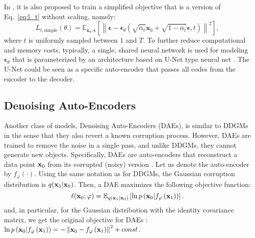 In \citet{ho2020denoising}, it is also proposed to train a simplified objective that is a version of Eq.~\ref{eq:l_t} without scaling, namely:
\begin{equation}\label{eq:l_t_simple}
    L_{t,\text {simple}}(\theta) = \mathbb{E}_{\mathbf{x}_{0}, \boldsymbol{\epsilon}}\left[\left\|\boldsymbol{\epsilon}-\boldsymbol{\epsilon}_{\theta}\left(\sqrt{\overline{\alpha}_{t}} \mathbf{x}_{0}+\sqrt{1-\overline{\alpha}_{t}} \boldsymbol{\epsilon}, t\right)\right\|^{2}\right] ,
\end{equation}
where $t$ is uniformly sampled between $1$ and $T$. To further reduce computational and memory costs, typically, a single, shared neural network is used for modeling $\boldsymbol{\epsilon}_{\theta}$ \cite{ho2020denoising, kingma2021variational, nichol2021improved} that is parameterized by an architecture based on U-Net type neural net \cite{ronneberger2015u}. The U-Net could be seen as a specific auto-encoder that passes all codes from the encoder to the decoder.

\subsection{Denoising Auto-Encoders}
Another class of models, Denoising Auto-Encoders (DAEs), is similar to DDGMs in the sense that they also revert a known corruption process. However, DAEs are trained to remove the noise in a single pass, and unlike DDGMs, they cannot generate new objects. Specifically, DAEs are auto-encoders that reconstruct a data point ${\mathbf{x}}_0$ from its corrupted (noisy) version \cite{alain2014regularized, bengio2013generalized, chen2014marginalized, vincent2008extracting}. Let us denote the auto-encoder by $f_{\varphi}(\cdot)$. Using the same notation as for DDGMs, the Gaussian corruption distribution is $q({\mathbf{x}}_1 | {\mathbf{x}}_0)$. Then, a DAE maximizes the following objective function:
\begin{equation}
    \ell({\mathbf{x}}_0;\varphi) = \mathbb{E}_{q({\mathbf{x}}_1 | {\mathbf{x}}_0)}\left[\ln p\left({\mathbf{x}}_0 | f_{\varphi}\left({\mathbf{x}}_1\right)\right)\right] .
\end{equation}
and, in particular, for the Gaussian distribution with the identity covariance matrix, we get the original objective for DAEs \cite{vincent2008extracting}: $\ln p\left({\mathbf{x}}_0 | f_{\varphi}\left({\mathbf{x}}_1\right)\right) = -\left\| {\mathbf{x}}_0 - f_{\varphi}\left({\mathbf{x}}_1\right) \right\|^2 + const$.
